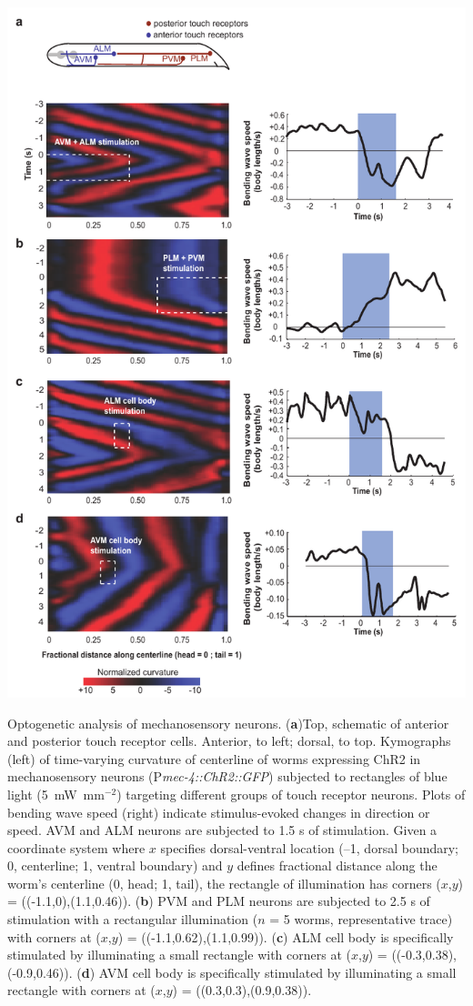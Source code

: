 \begin{FPfigure} 
\includegraphics[width=\textwidth]{figures/colbert4}
\caption[Optogenetic analysis of mechanosensory neurons. ]{ Optogenetic analysis of mechanosensory neurons.  (\textbf{a})Top, schematic of anterior and posterior touch receptor cells. 
Anterior, to left; dorsal, to top. Kymographs (left) of time-varying curvature of centerline of worms expressing ChR2 in mechanosensory neurons (P\textit{mec-4::ChR2::GFP}) subjected to rectangles of blue light (5~mW~mm$^{-2}$) targeting different groups of touch receptor neurons. Plots of bending wave speed (right) indicate stimulus-evoked changes in direction or speed. AVM and ALM neurons are subjected to 1.5 s of stimulation. Given a coordinate system where $x$ specifies dorsal-ventral location (–1, dorsal boundary; 0, centerline; 1, ventral boundary) and $y$ defines fractional distance along the worm's centerline (0, head; 1, tail), the rectangle of illumination has corners ($x$,$y$) = ((-1.1,0),(1.1,0.46)). 
(\textbf{b}) PVM and PLM neurons are subjected to 2.5 s of stimulation with a rectangular illumination ($n$ = 5 worms, representative trace) with corners at ($x$,$y$) = ((-1.1,0.62),(1.1,0.99)). (\textbf{c}) ALM cell body is specifically stimulated by illuminating a small rectangle with corners at ($x$,$y$) = ((-0.3,0.38), (-0.9,0.46)). 
(\textbf{d}) AVM cell body is specifically stimulated by illuminating a small rectangle with corners at ($x$,$y$) = ((0.3,0.3),(0.9,0.38)).\label{fig:colbert4}}
\end{FPfigure}

